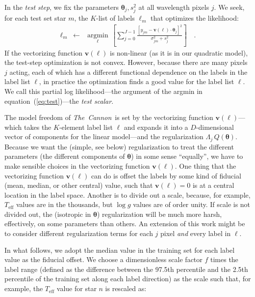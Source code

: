 \documentclass[12pt,preprint]{aastex}
\newcommand{\project}[1]{\textsl{#1}}
\newcommand{\TheCannon}{\project{The~Cannon}}
\newcommand{\logg}{\log g}
\newcommand{\Teff}{T_{\mathrm{eff}}}
\newcommand{\Dvector}[1]{\boldsymbol{#1}}
\newcommand{\vectheta}{\Dvector{\theta}}
\newcommand{\vecv}{\Dvector{v}}
\newcommand{\argmin}[1]{\underset{#1}{\operatorname{argmin}}\,}
\begin{document}
In the \emph{test step}, we fix the parameters $\vectheta_j,s^2_j$ at all
wavelength pixels $j$.  We seek, for each test set star $m$, the $K$-list of 
labels $\ell_m$ that optimizes the likelihood:
\begin{eqnarray}\label{eq:test}
  \ell_m &\leftarrow& \argmin{\ell}\left[
    \sum_{j=0}^{J-1} \frac{[y_{jm}-\vecv(\ell)\cdot\vectheta_j]^2}{\sigma^2_{jm}+s^2_j}
    \right]
  \quad .
\end{eqnarray}
If the vectorizing function $\vecv(\ell)$ is non-linear (as it is in our 
quadratic model), the test-step optimization is not convex.  However, because
there are many pixels $j$ acting, each of which has a different functional
dependence on the labels in the label list $\ell$, in practice the optimization 
finds a good value for the label list $\ell$.  We call
this partial log likelihood---the argument of the argmin in 
equation~(\ref{eq:test})---the \emph{test scalar}.


The model freedom of \TheCannon\ is set by the vectorizing function 
$\vecv(\ell)$---which takes the $K$-element label list $\ell$ and expands it 
into a $D$-dimensional vector of components for the linear model---and the 
regularization $\Lambda_j\,Q(\vectheta)$.  Because we want the (simple, see 
below) regularization to treat the different parameters (the different 
components of $\vectheta$) in some sense ``equally'', we have to make sensible 
choices in the vectorizing function $\vecv(\ell)$.  One thing that the 
vectorizing function $\vecv(\ell)$ can do is offset the labels by some kind of
fiducial (mean, median, or other central) value, such that $\vecv(\ell)=0$ is at
a central location in the label space.  Another is to divide out a scale, 
because, for example, $\Teff$ values are in the thousands, but $\logg$ values
are of order unity.  If scale is not divided out, the (isotropic in $\vectheta$)
regularization will be much more harsh, effectively, on some parameters than 
others.  An extension of this work might be to consider different regularization
terms for each $j$ pixel \emph{and} every label in $\ell$.


In what follows, we adopt the median value in the training set for each label 
value as the fiducial offset.  We choose a dimensionless scale factor $f$ 
times the label range (defined as the difference between the 97.5th percentile
and the 2.5th percentile of the training set along each label direction) as 
the scale such that, for example, the $\Teff$ value for star $n$ is rescaled as:
\end{document}
